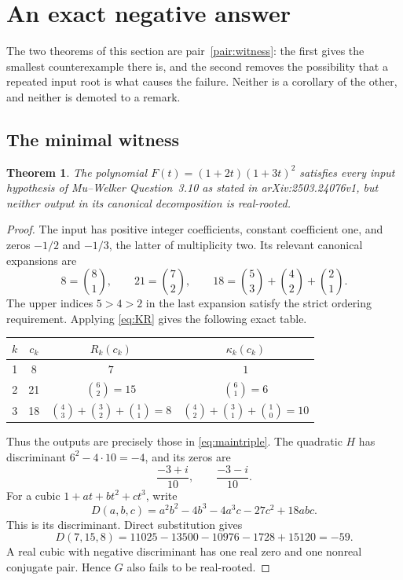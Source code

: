 \documentclass[11pt,letterpaper]{article}
\numberwithin{equation}{section}
\newtheorem{theorem}{Theorem}[section]
\theoremstyle{definition}
\theoremstyle{remark}
\newcommand{\kap}{\kappa}
\begin{document}
\section{An exact negative answer}\label{sec:counterexample}

The two theorems of this section are pair~\ref{pair:witness}: the first gives
the smallest counterexample there is, and the second removes the possibility
that a repeated input root is what causes the failure. Neither is a corollary
of the other, and neither is demoted to a remark.

\subsection{The minimal witness}

\begin{theorem}\label{thm:main}
The polynomial $F(t)=(1+2t)(1+3t)^2$ satisfies every input hypothesis of
Mu--Welker Question~3.10 as stated in arXiv:2503.24076v1, but neither output
in its canonical decomposition is real-rooted.
\end{theorem}
\begin{proof}
The input has positive integer coefficients, constant coefficient one, and
zeros $-1/2$ and $-1/3$, the latter of multiplicity two. Its relevant
canonical expansions are
\begin{equation}\label{eq:mainexp}
 8=\binom81,\qquad
 21=\binom72,\qquad
 18=\binom53+\binom42+\binom21.
\end{equation}
The upper indices $5>4>2$ in the last expansion satisfy the strict ordering
requirement. Applying \eqref{eq:KR} gives the following exact table.
\begin{center}
\begin{tabular}{@{}cccc@{}}
\toprule
$k$ & $c_k$ & $R_k(c_k)$ & $\kap_k(c_k)$\\
\midrule
1 & 8 & $7$ & $1$\\
2 & 21 & $\binom62=15$ & $\binom61=6$\\
3 & 18 & $\binom43+\binom32+\binom11=8$
       & $\binom42+\binom31+\binom10=10$\\
\bottomrule
\end{tabular}
\end{center}
Thus the outputs are precisely those in \eqref{eq:maintriple}. The quadratic
$H$ has discriminant $6^2-4\cdot10=-4$, and its zeros are
\begin{equation}\label{eq:Hexactroots}
 \frac{-3+i}{10},\qquad\frac{-3-i}{10}.
\end{equation}
For a cubic $1+at+bt^2+ct^3$, write
\begin{equation}\label{eq:cubicdisc}
 D(a,b,c)=a^2b^2-4b^3-4a^3c-27c^2+18abc.
\end{equation}
This is its discriminant. Direct substitution gives
\[
 D(7,15,8)=11025-13500-10976-1728+15120=-59.
\]
A real cubic with negative discriminant has one real zero and one nonreal
conjugate pair. Hence $G$ also fails to be real-rooted.
\end{proof}
\end{document}
